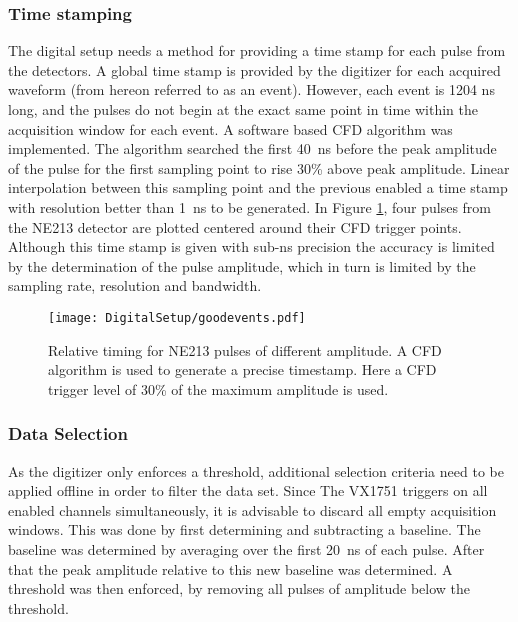 \documentclass[main.tex]{subfiles}
\begin{document}
\subsubsection{Time stamping}
The digital setup needs a method for providing a time stamp for each pulse from the detectors. A global time stamp is provided by the digitizer for each acquired waveform (from hereon referred to as an event). However, each event is 1204 ns long, and the pulses do not begin at the exact same point in time within the acquisition window for each event. A software based CFD algorithm was implemented. The algorithm searched the first \SI{40}{ns} before the peak amplitude of the pulse for the first sampling point to rise 30\% above peak amplitude. Linear interpolation between this sampling point and the previous enabled a time stamp with resolution better than \SI{1}{ns} to be generated. In Figure \ref{fig:cfd_trig}, four pulses from the NE213 detector are plotted centered around their CFD trigger points. Although this time stamp is given with sub-ns precision the accuracy is limited by the determination of the pulse amplitude, which in turn is limited by the sampling rate, resolution and bandwidth. 

\begin{figure}[hb!]
    \centering
        \texttt{[image: DigitalSetup/goodevents.pdf]}
        \caption[Examples of digitized pulses and their CFD trigger points]{Relative timing for NE213 pulses of different amplitude. A CFD algorithm is used to generate a precise timestamp. Here a CFD trigger level of 30\% of the maximum amplitude is used.}
    \label{fig:cfd_trig} 
\end{figure}

\subsubsection{Data Selection}
As the digitizer only enforces a threshold, additional selection criteria need to be applied offline in order to filter the data set. Since The VX1751 triggers on all enabled channels simultaneously, it is advisable to discard all empty acquisition windows. This was done by first determining and subtracting a baseline. The baseline was determined by averaging over the first \SI{20}{ns} of each pulse. After that the peak amplitude relative to this new baseline was determined. A threshold was then enforced, by removing all pulses of amplitude below the threshold.
\end{document}

